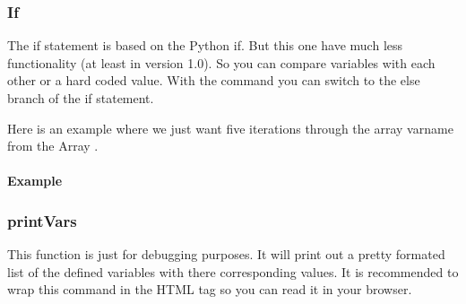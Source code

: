 \documentclass[letterpaper,10pt,english]{sphinxmanual}
\begin{document}
\subsubsection{If}
\label{\detokenize{html-parser:if}}
The if statement is based on the Python if. But this one have much less functionality (at least in version 1.0). So you can compare variables with each other or a hard coded value. With the  command you can switch to the else branch of the if statement.

Here is an example where we just want five iterations through the array \sphinxquotedblleft{}varname\sphinxquotedblright{} from the Array {\hyperref[\detokenize{html-parser:array-example}]{}}.


\paragraph{Example}
\label{\detokenize{html-parser:id1}}
\begin{sphinxVerbatim}[commandchars=\\\{\}]
     
     
  
  
  
  
  
\end{sphinxVerbatim}


\subsubsection{printVars}
\label{\detokenize{html-parser:printvars}}
This function is just for debugging purposes. It will print out a pretty formated list of the defined variables with there corresponding values. It is recommended to wrap this command in the HTML tag  so you can read it in your browser.
\end{document}
